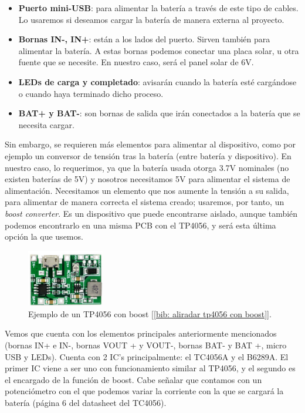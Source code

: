 \documentclass[12pt]{article}
\begin{document}
	\begin{itemize}
		\item \textbf{Puerto mini-USB}: para alimentar la batería a través de este tipo de cables. Lo usaremos si deseamos cargar la batería de manera externa al proyecto.
		\item \textbf{Bornas IN-, IN+}: están a los lados del puerto. Sirven también para alimentar la batería. A estas bornas podemos conectar una placa solar, u otra fuente que se necesite. En nuestro caso, será el panel solar de 6V.
		\item \textbf{LEDs de carga y completado}: avisarán cuando la batería esté cargándose o cuando haya terminado dicho proceso.
		\item \textbf{BAT+ y BAT-}: son bornas de salida que irán conectados a la batería que se necesita cargar.
	\end{itemize}

	\noindent Sin embargo, se requieren más elementos para alimentar al dispositivo, como por ejemplo un conversor de tensión tras la batería (entre batería y dispositivo). En nuestro caso, lo requerimos, ya que la batería usada otorga 3.7V nominales (no existen baterías de 5V) y nosotros necesitamos 5V para alimentar el sistema de alimentación. Necesitamos un elemento que nos aumente la tensión a su salida, para alimentar de manera correcta el sistema creado; usaremos, por tanto, un \textit{boost converter}. Es un dispositivo que puede encontrarse aislado, aunque también podemos encontrarlo en una misma PCB con el TP4056, y será esta última opción la que usemos. \\
	
	\begin{figure}[h]
		\begin{center}
			\includegraphics[width=0.3\textwidth]{img/tp4056_withBoost.png}
			\caption{Ejemplo de un TP4056 con boost [\ref{bib: aliradar tp4056 con boost}].}
			\label{TP4056 con boost}
		\end{center}
	\end{figure}
	
	\noindent Vemos que cuenta con los elementos principales anteriormente mencionados (bornas IN+ e IN-, bornas VOUT + y VOUT-, bornas BAT- y BAT
	+, micro USB y LEDs). Cuenta con 2 IC's principalmente: el TC4056A y el B6289A. El primer IC viene a ser uno con funcionamiento similar al TP4056, y el segundo es el encargado de la función de boost. Cabe señalar que contamos con un potenciómetro con el que podemos variar la corriente con la que se cargará la batería (página 6 del datasheet del TC4056). 
	
\end{document}
